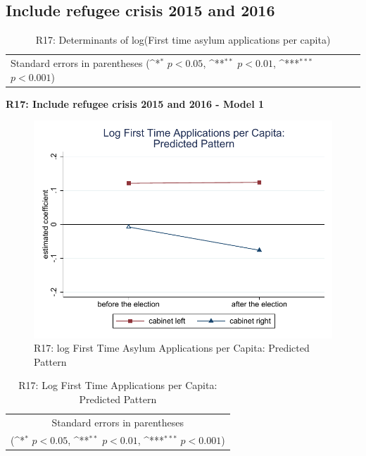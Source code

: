 \documentclass[10pt,a4paper]{scrartcl}
\begin{document}


\clearpage
\FloatBarrier
\subsection{Include refugee crisis 2015 and 2016}
\begin{table}[!ht]\centering
	\renewcommand{\arraystretch}{1.25}
	\small
	\def\sym#1{\ifmmode^{#1}\else\(^{#1}\)\fi}
	\caption{R17: Determinants of log(First time asylum applications per capita)}
	\begin{tabular}{l*{3}{c}}
		\hline\hline
		
		\hline\hline
		\multicolumn{4}{l}{\footnotesize Standard errors in parentheses (\sym{*} \(p<0.05\), \sym{**} \(p<0.01\), \sym{***} \(p<0.001\))}\\
	\end{tabular}
\end{table}

\clearpage
\textbf{R17: Include refugee crisis 2015 and 2016 - Model 1}
\begin{figure}[!ht]
	\centering
	\includegraphics[width=1\textwidth]{figures_edited/app_graph1_R17.pdf}
	\caption{R17: log First Time Asylum Applications per Capita: Predicted Pattern}
\end{figure}

\begin{table}[!ht]\centering
	\renewcommand{\arraystretch}{1.25}
	\def\sym#1{\ifmmode^{#1}\else\(^{#1}\)\fi}
	\caption{R17: Log First Time Applications per Capita: Predicted Pattern}
	\begin{tabular}{l*{2}{c}}
		\hline\hline
		
		\hline\hline
		\multicolumn{3}{c}{\footnotesize Standard errors in parentheses} \\
		\multicolumn{3}{c}{\footnotesize (\sym{*} \(p<0.05\), \sym{**} \(p<0.01\), \sym{***} \(p<0.001\))}\\
	\end{tabular}
\end{table}
\end{document}

